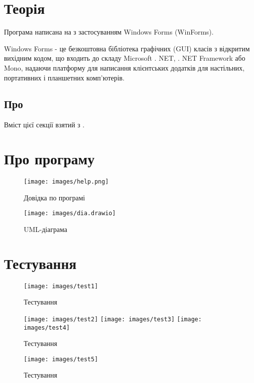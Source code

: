 \section{Теорія}
Програма написана на  з застосуванням Windows Forms (WinForms).

Windows Forms - це безкоштовна бібліотека графічних (GUI) класів з
відкритим вихідним кодом, що входить до складу Microsoft . NET, . NET Framework
або Mono, надаючи платформу для написання клієнтських додатків для настільних,
портативних і планшетних комп'ютерів.
\subsection{Про }
Вміст цієї секції взятий з \cite{mslearn}.
\begin{description}
	\item[\code{}]
\end{description}

\section{Про програму}
\begin{figure}[H]
	\centering
	\texttt{[image: images/help.png]}
	\caption{Довідка по програмі}
	\label{fig:help}
\end{figure}
\begin{figure}[H]
	\centering
	\texttt{[image: images/dia.drawio]}
	\caption{UML-діаграма}
	\label{fig:tag}
\end{figure}

\section{Тестування}
\begin{figure}[H]
	\centering
	\texttt{[image: images/test1]}
	\caption{Тестування}
	\label{fig:tag}
\end{figure}
\begin{figure}[H]
	\ContinuedFloat\centering
	\texttt{[image: images/test2]}
	\texttt{[image: images/test3]}
	\texttt{[image: images/test4]}
	\caption{Тестування}
	\label{fig:tag}
\end{figure}

\begin{figure}[H]
	\ContinuedFloat\centering
	\texttt{[image: images/test5]}
	\caption{Тестування}
	\label{fig:tag}
\end{figure}

